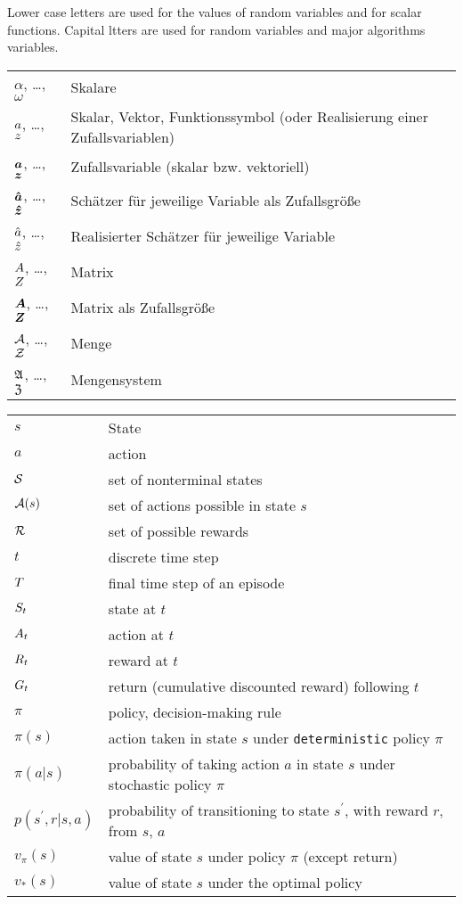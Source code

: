 Lower case letters are used for the values of random variables and for scalar functions. Capital ltters are used for random variables and major algorithms variables.

\begin{tabular}{p{1.5cm} p{12cm}}
$\alpha$, \dots, $\omega$ & Skalare \\
$a$, \dots, $z$ & Skalar, Vektor, Funktionssymbol (oder Realisierung einer Zufallsvariablen) \\
$\boldsymbol{a}$, \dots, $\boldsymbol{z}$ & Zufallsvariable (skalar bzw. vektoriell) \\
$\boldsymbol{\hat{a}}$, \dots, $\boldsymbol{\hat{z}}$ & Schätzer für jeweilige Variable als Zufallsgröße \\
$\hat{a}$, \dots, $\hat{z}$ & Realisierter Schätzer für jeweilige Variable \\
$A$, \dots, $Z$ & Matrix \\
$\boldsymbol{A}$, \dots, $\boldsymbol{Z}$ & Matrix als Zufallsgröße\\
$\mathcal{A}$, \dots, $\mathcal{Z}$ & Menge \\
$\mathfrak{A}$, \dots, $\mathfrak{Z}$ & Mengensystem \\
\end{tabular}


\begin{tabular}{p{1.5cm} p{12cm}}
$s$ & State \\
$a$ & action \\
$\mathcal{S}$ & set of nonterminal states \\
$\mathcal{A}(s)$ & set of actions possible in state $s$ \\
$\mathcal{R}$ & set of possible rewards \\

$t$ & discrete time step \\
$T$ & final time step of an episode \\
$S_t$ & state at $t$ \\
$A_t$ & action at $t$ \\
$R_t$ & reward at $t$ \\
$G_t$ & return (cumulative discounted reward) following $t$ \\
$\pi$ & policy, decision-making rule \\
$\pi(s)$ & action taken in state $s$ under \texttt{deterministic} policy $\pi$ \\
$\pi(a|s)$ & probability of taking action $a$ in state $s$ under stochastic policy $\pi$ \\
$p(s^',r|s, a)$ & probability of transitioning to state $s^'$, with reward $r$, from $s$, $a$ \\

$v_\pi(s)$ & value of state $s$ under policy $\pi$ (except return) \\
$v_*(s)$ & value of state $s$ under the optimal policy \\


\end{tabular}

